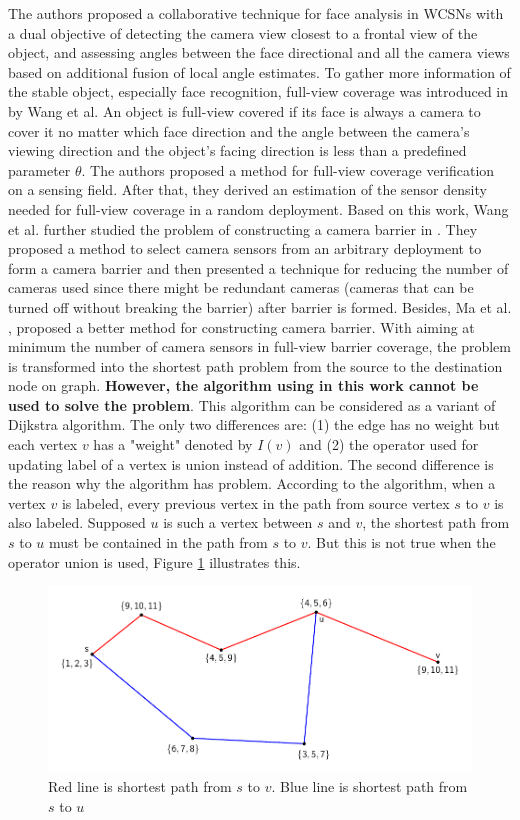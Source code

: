  The authors \cite{chang2006collaborative} proposed a collaborative technique for face
 analysis in WCSNs with a dual objective of
 detecting the camera view closest to a frontal view of the
 object, and assessing angles between the face directional and all the camera views based on additional fusion of local angle estimates. To gather more information of the stable object, especially face recognition, full-view coverage was introduced in \cite{wang2013achieving} by Wang et al. An object is full-view covered if its face is always a camera to cover it no matter which face direction and the angle between the camera’s viewing direction and the object’s facing direction is less than a predefined parameter $\theta$. The authors proposed a method for full-view coverage verification on a sensing field. After that, they derived an estimation of the sensor density needed for full-view coverage in a random deployment. Based on this work, Wang et al. further studied the problem of constructing a camera barrier in \cite{wang2011barrier}. They proposed a method to select camera sensors from an arbitrary deployment to form a camera barrier and then presented a technique for reducing the number of cameras used since there might be redundant cameras (cameras that can be turned off without breaking the barrier) after barrier is formed.
 Besides, Ma et al. \cite{ma2012minimum}, proposed a better method for constructing camera barrier. With aiming at minimum the number of camera sensors in full-view barrier coverage, the problem is transformed into the shortest path problem from the source to the destination node on graph. \textcolor{ProcessBlue}{\bfseries However, the algorithm using in this work cannot be used to solve the problem}. This algorithm can be considered as a variant of Dijkstra algorithm. The only two differences are: (1) the edge has no weight but each vertex $v$ has a "weight" denoted by $I(v)$ and (2) the operator used for updating label of a vertex is union instead of addition. The second difference is the reason why the algorithm has problem. According to the algorithm, when a vertex $v$ is labeled, every previous vertex in the path from source vertex $s$ to $v$ is also labeled. Supposed $u$ is such a vertex between $s$ and $v$, the shortest path from $s$ to $u$ must be contained in the path from $s$ to $v$. But this is not true when the operator union is used, Figure \ref{fig:01} illustrates this.
 
\begin{figure}[p]
	\centering
	\includegraphics[scale=0.6]{wrongDijstra.pdf}
	\caption{Red line is shortest path from $s$ to $v$. Blue line is shortest path from $s$ to $u$}
	\label{fig:01}
\end{figure}

